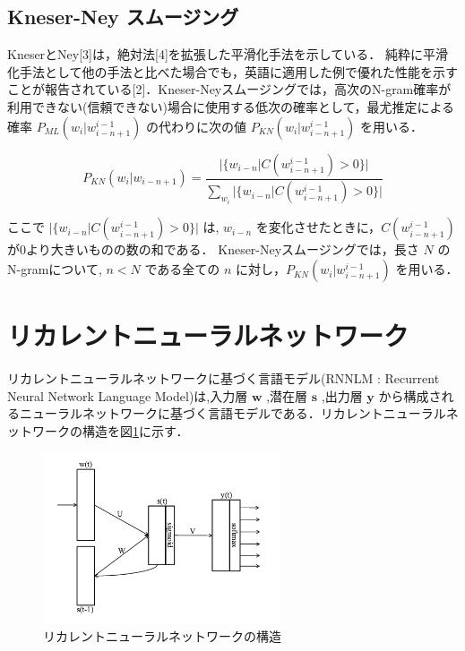 \subsection{Kneser-Ney スムージング}


KneserとNey[3]は，絶対法[4]を拡張した平滑化手法を示している．
純粋に平滑化手法として他の手法と比べた場合でも，英語に適用した例で優れた性能を示すことが報告されている[2]．Kneser-Neyスムージングでは，高次のN-gram確率が利用できない(信頼できない)場合に使用する低次の確率として，最尤推定による確率 $P_{ML} (w_i|w_{i-n+1}^{i-1})$ の代わりに次の値 $P_{KN} (w_i|w_{i-n+1}^{i-1})$ を用いる．

\begin{equation}
		P_{KN} (w_i|w_{i-n+1}) = \frac{|\{w_{i-n}|C(w_{i-n+1}^{i-1}) > 0\}|}{\sum_{w_i} |\{w_{i-n}|C(w_{i-n+1}^{i-1}) > 0\}|} 
    \label{ngram_smoosing2}
\end{equation}

ここで $|\{w_{i-n}|C(w_{i-n+1}^{i-1}) > 0\}|$ は, $w_{i-n}$ を変化させたときに，$C(w_{i-n+1}^{i-1})$ が0より大きいものの数の和である．
Kneser-Neyスムージングでは，長さ $N$ のN-gramについて, $n  <  N$ である全ての $n$ に対し，$P_{KN} (w_i|w_{i-n+1}^{i-1})$ を用いる．

\section{リカレントニューラルネットワーク}
リカレントニューラルネットワークに基づく言語モデル(RNNLM : Recurrent Neural Network Language Model)は,入力層 $\bm{w}$ ,潜在層 $\bm{s}$ ,出力層 $\bm{y}$ から構成されるニューラルネットワークに基づく言語モデルである．リカレントニューラルネットワークの構造を図\ref{fig_rnn}に示す．

\begin{figure}[h]
    \centering
    \includegraphics[width=7cm]{./image/rnn.png}
    \caption{リカレントニューラルネットワークの構造}
    \label{fig_rnn}
\end{figure}

